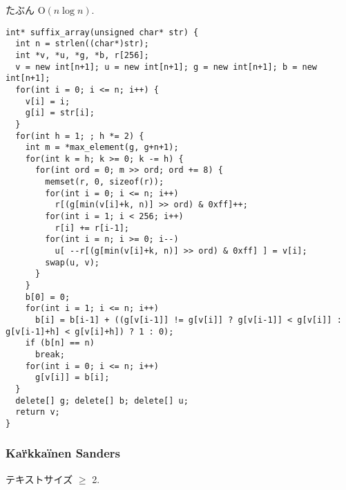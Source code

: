 たぶん $\mathrm{O}(n \log n )$.

\begin{lstlisting}
int* suffix_array(unsigned char* str) {
  int n = strlen((char*)str);
  int *v, *u, *g, *b, r[256];
  v = new int[n+1]; u = new int[n+1]; g = new int[n+1]; b = new int[n+1];
  for(int i = 0; i <= n; i++) {
    v[i] = i;
    g[i] = str[i];
  }
  for(int h = 1; ; h *= 2) {
    int m = *max_element(g, g+n+1);
    for(int k = h; k >= 0; k -= h) {
      for(int ord = 0; m >> ord; ord += 8) {
        memset(r, 0, sizeof(r));
        for(int i = 0; i <= n; i++)
          r[(g[min(v[i]+k, n)] >> ord) & 0xff]++;
        for(int i = 1; i < 256; i++)
          r[i] += r[i-1];
        for(int i = n; i >= 0; i--)
          u[ --r[(g[min(v[i]+k, n)] >> ord) & 0xff] ] = v[i];
        swap(u, v);
      }
    }
    b[0] = 0;
    for(int i = 1; i <= n; i++)
      b[i] = b[i-1] + ((g[v[i-1]] != g[v[i]] ? g[v[i-1]] < g[v[i]] : g[v[i-1]+h] < g[v[i]+h]) ? 1 : 0);
    if (b[n] == n)
      break;
    for(int i = 0; i <= n; i++)
      g[v[i]] = b[i];
  }
  delete[] g; delete[] b; delete[] u;
  return v;
}
\end{lstlisting}


\subsubsection{Ka\"rkka\"inen Sanders}

テキストサイズ $\geq$ 2.

